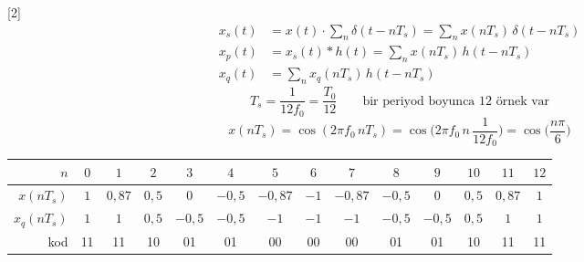 \documentclass[11pt,a4paper]{article}
\begin{document}
[2]
\begin{align*}
x_s(t) &= x(t)\cdot\sum_n \delta(t-nT_s)=\sum_n x(nT_s)\,\delta(t-nT_s)\\
x_p(t) &= x_s(t)*h(t)=\sum_n x(nT_s)\,h(t-nT_s)\\
x_q(t) &= \sum_n x_q(nT_s)\,h(t-nT_s)
\end{align*}
\[ T_s=\frac{1}{12 f_0}=\frac{T_0}{12} \qquad \text{bir periyod boyunca 12 örnek var} \]
\[ x(nT_s)=\cos(2\pi f_0\, nT_s)=\cos\Big(2\pi f_0\, n\,\frac{1}{12 f_0}\Big)=\cos\Big(\frac{n\pi}{6}\Big) \]
\begin{center}
\small
\begin{tabular}{r|ccccccccccccc}
$n$ & $0$ & $1$ & $2$ & $3$ & $4$ & $5$ & $6$ & $7$ & $8$ & $9$ & $10$ & $11$ & $12$ \\ \hline
$x(nT_s)$ & $1$ & $0{,}87$ & $0{,}5$ & $0$ & $-0{,}5$ & $-0{,}87$ & $-1$ & $-0{,}87$ & $-0{,}5$ & $0$ & $0{,}5$ & $0{,}87$ & $1$ \\ \hline
$x_q(nT_s)$ & $1$ & $1$ & $0{,}5$ & $-0{,}5$ & $-0{,}5$ & $-1$ & $-1$ & $-1$ & $-0{,}5$ & $-0{,}5$ & $0{,}5$ & $1$ & $1$ \\ \hline
kod & \textcolor{murekkep}{11} & \textcolor{murekkep}{11} & \textcolor{murekkep}{10} & \textcolor{murekkep}{01} & \textcolor{murekkep}{01} & \textcolor{murekkep}{00} & \textcolor{murekkep}{00} & \textcolor{murekkep}{00} & \textcolor{murekkep}{01} & \textcolor{murekkep}{01} & \textcolor{murekkep}{10} & \textcolor{murekkep}{11} & \textcolor{murekkep}{11}
\end{tabular}
\end{center}
\begin{center}
\end{center}
\end{document}
